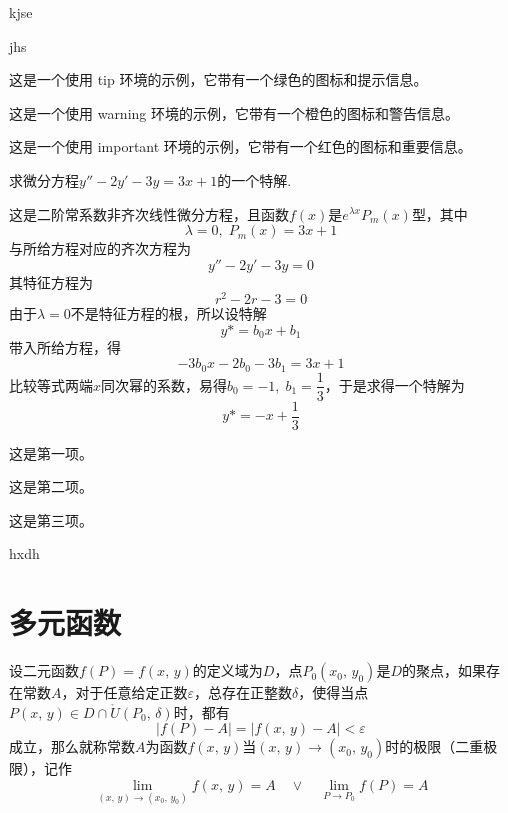 \documentclass[12pt, a4paper, oneside, UTF8]{ctexbook}
\begin{document}
	\begin{kuohao}
		\item  kjse
		\item jhs 
	\end{kuohao}

	
	\begin{tip}
		这是一个使用 tip 环境的示例，它带有一个绿色的图标和提示信息。
	\end{tip}
	
	
	\begin{warning}
		这是一个使用 warning 环境的示例，它带有一个橙色的图标和警告信息。
	\end{warning}

	
	\begin{important}
		这是一个使用 important 环境的示例，它带有一个红色的图标和重要信息。
	\end{important}
	\begin{example}
		求微分方程$y''-2y'-3y=3x+1$的一个特解.
	\end{example}
	\begin{solution}
		这是二阶常系数非齐次线性微分方程，且函数$f(x)$是$e^{\lambda{x}}P_m(x)$型，其中
		\[
		\lambda = 0,\;P_m(x) = 3x+1
		\]
		与所给方程对应的齐次方程为
		\[
		y''-2y'-3y=0
		\]
		其特征方程为
		\[
		r^2-2r-3 = 0
		\]
		由于$\lambda = 0$不是特征方程的根，所以设特解
		\[
		y* = b_0 x + b_1
		\]
		带入所给方程，得
		\[
		-3b_0 x - 2b_0 - 3b_1 = 3x+1
		\]
		比较等式两端$x$同次幂的系数，易得$b_0 = -1,\;b_1 = \dfrac{1}{3}$，于是求得一个特解为
		\[
		y* = -x + \frac{1}{3}
		\]
	\end{solution}
	\begin{introduction}
		\item 这是第一项。
		\item 这是第二项。
		\item 这是第三项。
	\end{introduction}
	\begin{solution}
		hxdh
	\end{solution}
	
	\section{多元函数}
	\begin{defn}
		设二元函数$f(P) = f(x,\,y)$的定义域为$D$，点$P_0(x_0,\,y_0)$是$D$的聚点，如果存在常数$A$，对于任意给定正数$\varepsilon$，总存在正整数$\delta$，使得当点$P(x,\,y) \in D \cap \mathring{U}(P_0,\,\delta)$时，都有
		\[
		|f(P)-A| = |f(x,\,y) - A| < \varepsilon
		\]
		成立，那么就称常数$A$为函数$f(x,\,y)$当$(x,\,y) \to (x_0,\,y_0)$时的极限（二重极限），记作
		\[
		\lim_{(x,\,y) \to (x_0,\,y_0)}f(x,\,y) = A \quad \lor \quad \lim_{P \to P_0}f(P) = A
		\]
	\end{defn}
	
\end{document}
